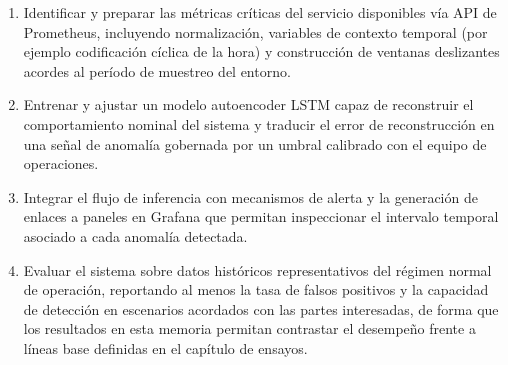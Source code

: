 \begin{enumerate}
\item Identificar y preparar las métricas críticas del servicio disponibles vía API de Prometheus, incluyendo normalización, variables de contexto temporal (por ejemplo codificación cíclica de la hora) y construcción de ventanas deslizantes acordes al período de muestreo del entorno.
\item Entrenar y ajustar un modelo autoencoder LSTM capaz de reconstruir el comportamiento nominal del sistema y traducir el error de reconstrucción en una señal de anomalía gobernada por un umbral calibrado con el equipo de operaciones.
\item Integrar el flujo de inferencia con mecanismos de alerta y la generación de enlaces a paneles en Grafana que permitan inspeccionar el intervalo temporal asociado a cada anomalía detectada.
\item Evaluar el sistema sobre datos históricos representativos del régimen normal de operación, reportando al menos la tasa de falsos positivos y la capacidad de detección en escenarios acordados con las partes interesadas, de forma que los resultados en esta memoria permitan contrastar el desempeño frente a líneas base definidas en el capítulo de ensayos.
\end{enumerate}
